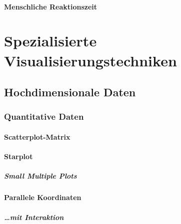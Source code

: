             \subsubsection{Menschliche Reaktionszeit} %

\chapter{Spezialisierte Visualisierungstechniken} %

    \section{Hochdimensionale Daten} %

        \subsection{Quantitative Daten} %

            \subsubsection{Scatterplot-Matrix} %

            \subsubsection{Starplot} %

                \paragraph{Small Multiple Plots} %

            \subsubsection{Parallele Koordinaten} %

                \paragraph{\dots mit Interaktion} %

